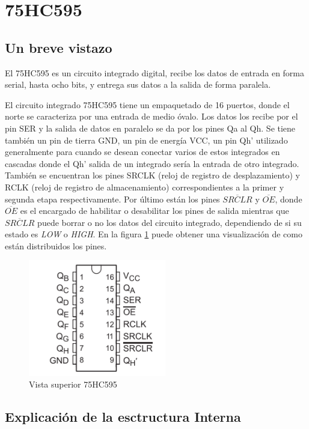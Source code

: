 \documentclass{article}
\begin{document}
\section{75HC595}
\subsection{Un breve vistazo}
El 75HC595 es un circuito integrado digital, recibe los datos de entrada en forma serial,  hasta ocho bits, y entrega sus datos a la salida de forma paralela. 

El circuito integrado 75HC595 tiene un empaquetado de 16 puertos, donde el norte se caracteriza por una entrada de medio óvalo. Los datos los recibe por el pin SER  y la salida de datos en paralelo se da por los pines Qa al Qh. Se tiene también un pin de tierra GND, un pin de energía VCC, un pin Qh' utilizado generalmente para cuando se desean conectar varios de estos integrados en cascadas donde el Qh' salida de un integrado sería la entrada de otro integrado. También se encuentran los pines SRCLK (reloj de registro de desplazamiento) y RCLK (reloj de registro de almacenamiento) correspondientes a la primer y segunda etapa respectivamente. Por último están los pines $\overline{SRCLR}$ y $\overline{OE}$, donde $\overline{OE}$ es el encargado de habilitar o desabilitar los pines de salida mientras que $\overline{SRCLR}$ puede borrar o no los datos del circuito integrado, dependiendo de si su estado es \textit{LOW} o \textit{HIGH}. En la figura \ref{fig:Pines ci} puede obtener una visualización de como están distribuidos los pines.

    \begin{figure}[h]
    \includegraphics[width=6cm]{imagen/Pines ci.png}
    \centering
    \caption{Vista superior 75HC595}
    \label{fig:Pines ci}
    \end{figure}

\newpage
\subsection{Explicación de la esctructura Interna}
\end{document}
